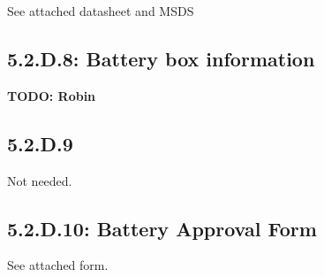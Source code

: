 \documentclass[10pt]{article}
\begin{document}
See attached datasheet and MSDS




\subsection{5.2.D.8: Battery box information}

\textbf{TODO: Robin}

\subsection{5.2.D.9}

Not needed.

\subsection{5.2.D.10: Battery Approval Form}

See attached form.


\end{document}
